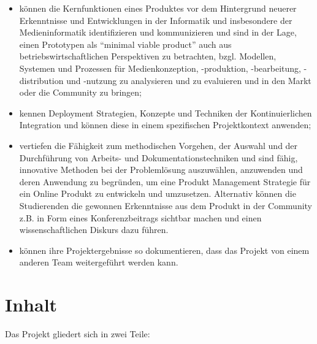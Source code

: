 \begin{itemize}
\tightlist
\item
  können die Kernfunktionen eines Produktes vor dem Hintergrund neuerer
  Erkenntnisse und Entwicklungen in der Informatik und insbesondere der
  Medieninformatik identifizieren und kommunizieren und sind in der
  Lage, einen Prototypen als ``minimal viable product'' auch aus
  betriebswirtschaftlichen Perspektiven zu betrachten, bzgl. Modellen,
  Systemen und Prozessen für Medienkonzeption, -produktion,
  -bearbeitung, -distribution und -nutzung zu analysieren und zu
  evaluieren und in den Markt oder die Community zu bringen;
\item
  kennen Deployment Strategien, Konzepte und Techniken der
  Kontinuierlichen Integration und können diese in einem spezifischen
  Projektkontext anwenden;
\item
  vertiefen die Fähigkeit zum methodischen Vorgehen, der Auswahl und der
  Durchführung von Arbeits- und Dokumentationstechniken und sind fähig,
  innovative Methoden bei der Problemlösung auszuwählen, anzuwenden und
  deren Anwendung zu begründen, um eine Produkt Management Strategie für
  ein Online Produkt zu entwickeln und umzusetzen. Alternativ können die
  Studierenden die gewonnen Erkenntnisse aus dem Produkt in der
  Community z.B. in Form eines Konferenzbeitrags sichtbar machen und
  einen wissenschaftlichen Diskurs dazu führen.
\item
  können ihre Projektergebnisse so dokumentieren, dass das Projekt von
  einem anderen Team weitergeführt werden kann.
\end{itemize}

\section*{Inhalt\label{/mi-2017/modulbeschreibungen-master/MA_Modul_Projekt_Verwertung}}\label{inhaltpathlabelmi-2017modulbeschreibungen-mastermaux5fmodulux5fprojektux5fverwertung}

Das Projekt gliedert sich in zwei Teile:

